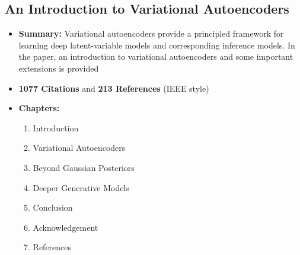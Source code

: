\documentclass[11pt]{article}
\begin{document}
    \subsection{An Introduction to Variational Autoencoders \cite{DBLP:journals/corr/abs-1906-02691}}
    \begin{itemize}
        \item \textbf{Summary:} Variational autoencoders provide a principled framework
            for learning deep latent-variable models and corresponding
            inference models. In the paper, an introduction
            to variational autoencoders and some important extensions is provided
        \item \textbf{1077 Citations} and \textbf{213 References} (IEEE style)
        \item \textbf{Chapters:}
            \begin{enumerate}
                \item Introduction
                \item Variational Autoencoders 
                \item Beyond Gaussian Posteriors 
                \item Deeper Generative Models 
                \item Conclusion 
                \item Acknowledgement
                \item References
            \end{enumerate}
    \end{itemize}
\end{document}
